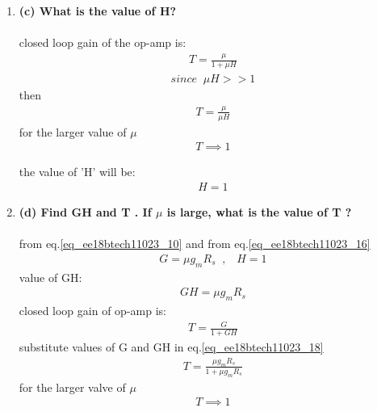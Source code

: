 \begin{enumerate}[label=\thesection.\arabic*.,ref=\thesection.\theenumi]
\item
\label{Question_1c_ee18btech11023}
\textbf{
(c) What is the value of H?}
\\
\solution\\
closed loop gain of the op-amp is:
\begin{align}
    T = \frac{\mu}{1 + \mu H}
    \label{eq_ee18btech11023_14}
\end{align}
\begin{align*}
    since \;\; \mu H >> 1
\end{align*}
then 
\begin{align}
    T = \frac{\mu}{\mu H}
    \label{eq_ee18btech11023_15}
\end{align}
for the larger value of $\mu$
\begin{align*}
   T \implies 1 
\end{align*}

the value of 'H' will be:
\begin{align}
    H = 1
    \label{eq_ee18btech11023_16}
\end{align}
\item
\label{Question_1d_ee18btech11023}
\textbf{
(d) Find GH and T . If $\mu$ is large, what is the value of T ?}\\
\solution\\
from eq.\ref{eq_ee18btech11023_10} and from eq.\ref{eq_ee18btech11023_16}
\begin{align*}
    G = \mu g_m R_s\;\; ,  \;\;\; H = 1
\end{align*}
value of GH:
\begin{align}
    GH = \mu g_m R_s
     \label{eq_ee18btech11023_17}
\end{align}
closed loop gain of op-amp is:
\begin{align}
    T = \frac{G}{1+GH}
     \label{eq_ee18btech11023_18}
\end{align}
substitute values of G and GH in eq.\ref{eq_ee18btech11023_18}
\begin{align}
    T = \frac{\mu g_m R_s}{1+\mu g_m R_s}
    \label{eq_ee18btech11023_19}
\end{align}
for the larger valve of $\mu$
\begin{align}
    T \implies 1
    \label{eq_ee18btech11023_20}
\end{align}


\end{enumerate}
